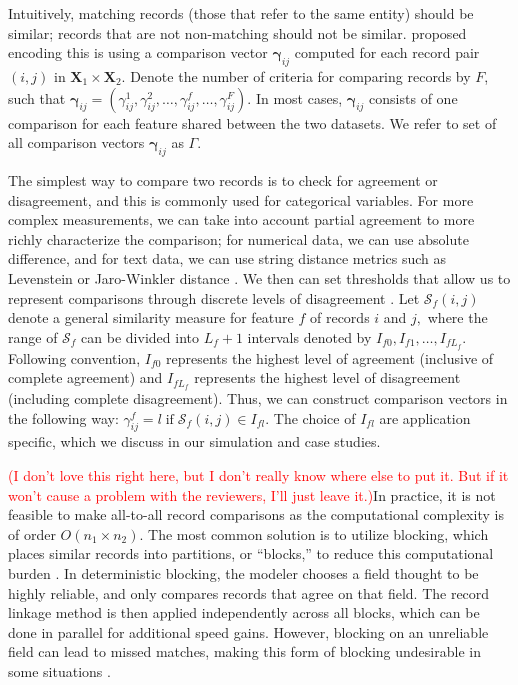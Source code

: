 \documentclass[ba]{imsart}
\begin{document}

Intuitively, matching records (those that refer to the same entity) should be similar; records that are not non-matching should not be similar. \cite{fellegi_theory_1969} proposed encoding this is using a comparison vector $\bm{\gamma}_{ij}$ computed for each record pair $(i,j)$ in $\bm{X}_1 \times \bm{X}_2.$ Denote the number of criteria for comparing records by $F$, such that $\bm{\gamma}_{ij} = (\gamma_{ij}^1, \gamma_{ij}^2, \ldots, \gamma_{ij}^f, \ldots, \gamma_{ij}^F).$ In most cases, $\bm{\gamma}_{ij}$ consists of one comparison for each feature shared between the two datasets. We refer to set of all comparison vectors $\bm{\gamma}_{ij}$ as $\Gamma$.

The simplest way to compare two records is to check for agreement or disagreement, and this is commonly used for categorical variables. For more complex measurements, we can take into account partial agreement to more richly characterize the comparison; for numerical data, we can use absolute difference, and for text data, we can use string distance metrics such as Levenstein or Jaro-Winkler distance \citep{cohen2003comparison}. We then can set thresholds that allow us to represent comparisons through discrete levels of disagreement \citep{bilenko2006riddle, elmagarmid_duplicate_2007}. Let $\mathcal{S}_f(i,j)$ denote a general similarity measure for feature $f$ of records $i$ and $j,$ where the range of $\mathcal{S}_f$ can be divided into $L_f +1$ intervals denoted by $I_{f0}, I_{f1}, \ldots, I_{fL_f}$. Following convention, $I_{f0}$ represents the highest level of agreement (inclusive of complete agreement) and $I_{fL_f}$ represents the highest level of disagreement (including complete disagreement). Thus, we can construct comparison vectors in the following way: $\gamma_{ij}^f = l \; \text{if} \; \mathcal{S}_f(i,j) \in I_{fl}.$ The choice of $I_{fl}$ are application specific, which we discuss in our simulation and case studies. 

\textcolor{red}{(I don't love this right here, but I don't really know where else to put it. But if it won't cause a problem with the reviewers, I'll just leave it.)}In practice, it is not feasible to make all-to-all record comparisons as the computational complexity is of order $O(n_1 \times n_2).$ The most common solution is to utilize blocking, which places similar records into partitions, or ``blocks,'' to reduce this computational burden \citep{steorts_comparison_2014, murray2016probabilistic}. In deterministic blocking, the modeler chooses a field thought to be highly reliable, and only compares records that agree on that field. The record linkage method is then applied independently across all blocks, which can be done in parallel for additional speed gains. However, blocking on an unreliable field can lead to missed matches, making this form of blocking undesirable in some situations \citep{steorts_comparison_2014}.
\end{document}
